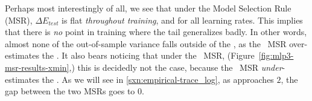 Perhaps most interestingly of all, we see that under the \TRACELOG Model Selection Rule (MSR), $\Delta E_{test}$ is flat \emph{throughout 
training}, and for all learning rates. This implies that there is \emph{no} point in training where the 
\TRACELOG tail generalizes badly. In other words, almost none of the out-of-sample variance falls outside of the \EffectiveCorrelationSpace, as the \TRACELOG~MSR over-estimates the \EffectiveCorrelationSpace. It also bears noticing that under the 
\POWERLAW~MSR, (Figure~\ref{fig:mlp3-msr-results-xmin},) this is decidedly not the case, because the \POWERLAW~MSR \emph{under}-estimates the \EffectiveCorrelationSpace. As we will see in \ref{sxn:empirical-trace_log}, as \ALPHA approaches $2$, the gap between the two MSRs goes to $0$.



